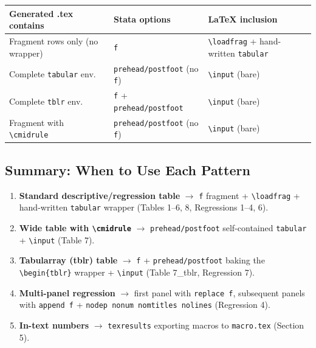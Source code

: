 \documentclass[11pt]{article}
\numberwithin{table}{section}
\begin{document}
\begin{tabular}{lll}
\toprule
\textbf{Generated .tex contains} & \textbf{Stata options} & \textbf{LaTeX inclusion} \\
\midrule
Fragment rows only (no wrapper) & \texttt{f} & \texttt{\textbackslash loadfrag} + hand-written \texttt{tabular} \\
Complete \texttt{tabular} env.   & \texttt{prehead/postfoot} (no \texttt{f}) & \texttt{\textbackslash input} (bare) \\
Complete \texttt{tblr} env.       & \texttt{f} + \texttt{prehead/postfoot} & \texttt{\textbackslash input} (bare) \\
Fragment with \texttt{\textbackslash cmidrule} & \texttt{prehead/postfoot} (no \texttt{f}) & \texttt{\textbackslash input} (bare) \\
\bottomrule
\end{tabular}

\subsection{Summary: When to Use Each Pattern}

\begin{enumerate}
    \item \textbf{Standard descriptive/regression table} $\rightarrow$ \texttt{f} fragment + \texttt{\textbackslash loadfrag} + hand-written \texttt{tabular} wrapper (Tables 1--6, 8, Regressions 1--4, 6).
    \item \textbf{Wide table with \texttt{\textbackslash cmidrule}} $\rightarrow$ \texttt{prehead/postfoot} self-contained \texttt{tabular} + \texttt{\textbackslash input} (Table 7).
    \item \textbf{Tabularray (tblr) table} $\rightarrow$ \texttt{f} + \texttt{prehead/postfoot} baking the \texttt{\textbackslash begin\{tblr\}} wrapper + \texttt{\textbackslash input} (Table 7\_tblr, Regression 7).
    \item \textbf{Multi-panel regression} $\rightarrow$ first panel with \texttt{replace f}, subsequent panels with \texttt{append f} + \texttt{nodep nonum nomtitles nolines} (Regression 4).
    \item \textbf{In-text numbers} $\rightarrow$ \texttt{texresults} exporting macros to \texttt{macro.tex} (Section 5).
\end{enumerate}
\end{document}
